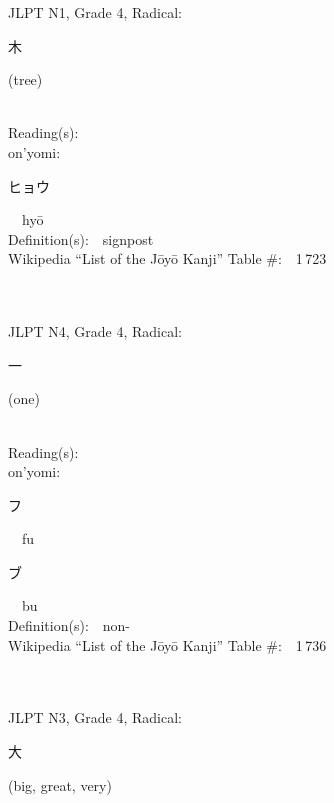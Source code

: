 \begin{multicols}{2}
{JLPT N1, Grade 4, Radical:\ \ {\begin{CJK}{UTF8}{min} 木 \end{CJK}} (tree) } \\
Reading(s):\ \ \\
{\hspace*{1em}}on'yomi:\ \ \\
{\hspace*{2em}}{\begin{CJK}{UTF8}{min} ヒョウ \end{CJK}}\ \ hy\=o\ \ \\
Definition(s):\ \ signpost \\
Wikipedia ``List of the J\=oy\=o Kanji'' Table \#:\ \ 1\,723 \\
\ \ \\
{\fontsize{34pt}{40pt}  }\ \ \\  %
{JLPT N4, Grade 4, Radical:\ \ {\begin{CJK}{UTF8}{min} 一 \end{CJK}} (one) } \\
Reading(s):\ \ \\
{\hspace*{1em}}on'yomi:\ \ \\
{\hspace*{2em}}{\begin{CJK}{UTF8}{min} フ \end{CJK}}\ \ fu\ \ \\
{\hspace*{2em}}{\begin{CJK}{UTF8}{min} ブ \end{CJK}}\ \ bu\ \ \\
Definition(s):\ \ non- \\
Wikipedia ``List of the J\=oy\=o Kanji'' Table \#:\ \ 1\,736 \\
\ \ \\
{\fontsize{34pt}{40pt}  }\ \ \\  %
{JLPT N3, Grade 4, Radical:\ \ {\begin{CJK}{UTF8}{min} 大 \end{CJK}} (big, great, very) } \\

\end{multicols}

